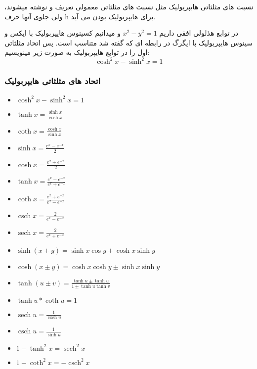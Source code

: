 \documentclass[12pt, a4paper, oneside]{article}
\DeclareMathOperator{\sech}{sech}
\DeclareMathOperator{\csch}{csch}
\begin{document}
نسبت های مثلثاتی هایپربولیک مثل نسبت های مثلثاتی معمولی تعریف و نوشته میشوند، ولی جلوی آنها حرف h برای هایپربولیک بودن می آید.

در توابع هذلولی افقی داریم $x^2 - y^2 = 1$ و میدانیم کسینوس هایپربولیک با ایکس و سینوس هایپربولیک با ایگرگ در رابطه ای که گفته شد متناسب است.
پس اتحاد مثلثاتی اول را در توابع هایپربولیک به صورت زیر مینویسیم: 
\[\cosh^2 x - \sinh^2 x = 1\]
\subsubsection{اتحاد های مثلثاتی هایپربولیک}
\begin{latin}
\begin{itemize}
    \item $\cosh^2 x - \sinh^2 x = 1$
    \item $\tanh x = \frac{\sinh x}{\cosh x}$
    \item $\coth x = \frac{\cosh x}{\sinh x}$
    \item $\sinh x = \frac{e^x - e^{-x}}{2}$
    \item $\cosh x = \frac{e^x + e^{-x}}{2}$
    \item $\tanh x = \frac{e^x - e^{-x}}{e^x + e^{-x}}$
    \item $\coth x = \frac{e^x + e^{-x}}{e^x - e^{-x}}$
    \item $\csch x = \frac{ 2 }{ e^x - e^{ -x } }$
    \item $\sech x = \frac{ 2 }{ e^x + e^{ -x } }$
    \item $\sinh(x \pm y) = \sinh x\cos y \pm \cosh x\sinh y$
    \item $\cosh(x \pm y) = \cosh x\cosh y \pm \sinh x\sinh y$
    \item $\tanh(u \pm v) = \frac{ \tanh u \pm \tanh u }{ 1 \pm \tanh u\tanh v }$
    \item $\tanh u * \coth u = 1$
    \item $\sech u = \frac{1}{ \cosh u }$
    \item $\csch u = \frac{1}{\sinh u }$
    \item $1-\tanh^2x = \sech^2x$
    \item $1-\coth^2x = -\csch^2x$
\end{itemize}
\end{latin}
\end{document}
